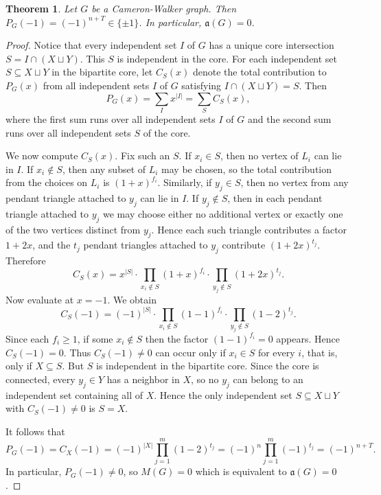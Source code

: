 \documentclass[12pt]{amsart}
\theoremstyle{plain}
\newtheorem{thm}{Theorem}[section]
\theoremstyle{definition}
\begin{document}
\begin{thm}\label{thm:CW_a}
  Let $G$ be a Cameron-Walker graph. Then \(P_G(-1)=(-1)^{n+T}\in\{\pm 1\}\).  In particular, $\mathfrak a (G)=0$.
\end{thm}



\begin{proof}
Notice that every independent set $I$ of $G$ has a unique core intersection  $S=I\cap (X\sqcup Y)$. This $S$ is independent in the core.  For each independent set $S\subseteq X\sqcup Y$ in the bipartite core, let $C_S(x)$ denote the total contribution to $P_G(x)$ from all independent sets $I$ of $G$ satisfying $I\cap (X\sqcup Y)=S$. Then
\[
P_G(x)=\sum_{I} x^{|I|}= \sum_{S} C_S(x),
\]
where the first sum runs over all independent sets $I$ of $G$ and the second sum runs over all independent sets $S$ of the core.

We now compute $C_S(x)$. Fix such an $S$.  If $x_i\in S$, then no vertex of $L_i$ can lie in $I$. If $x_i\notin S$, then any subset of $L_i$ may be chosen, so the total contribution from the choices on $L_i$ is \((1+x)^{f_i}\). Similarly, if $y_j\in S$, then no vertex from any pendant triangle attached to $y_j$ can lie in $I$. If $y_j\notin S$, then in each pendant triangle attached to $y_j$ we may choose either no additional vertex or exactly one of the two vertices distinct from $y_j$. Hence each such triangle contributes a factor $1+2x$, and the $t_j$ pendant triangles attached to $y_j$ contribute \((1+2x)^{t_j}\). Therefore
\[
C_S(x)=x^{|S|}\cdot \prod_{x_i\notin S}(1+x)^{f_i}\cdot \prod_{y_j\notin S}(1+2x)^{t_j}.
\]
Now evaluate at $x=-1$. We obtain
\[
C_S(-1)=(-1)^{|S|}\cdot \prod_{x_i\notin S}(1-1)^{f_i}\cdot \prod_{y_j\notin S}(1-2)^{t_j}.
\]
Since each $f_i\ge 1$, if some $x_i\notin S$ then the factor $(1-1)^{f_i}=0$ appears. Hence $C_S(-1)=0$. Thus $C_S(-1)\neq 0$ can occur only if $x_i\in S$ for every $i$, that is, only if $X\subseteq S$. But $S$ is independent in the bipartite core. Since the core is connected, every $y_j\in Y$ has a neighbor in $X$, so no $y_j$ can belong to an independent set containing all of $X$. Hence the only independent set $S\subseteq X\sqcup Y$ with $C_S(-1)\neq 0$ is $S=X$.


It follows that
\[
P_G(-1)=C_X(-1)=(-1)^{|X|}\prod_{j=1}^m(1-2)^{t_j}
= (-1)^n\prod_{j=1}^m(-1)^{t_j}
= (-1)^{n+T}.
\]
In particular, $P_G(-1)\neq 0$, so $M(G)=0$ which is equivalent to $\mathfrak a (G)=0$.
\end{proof}
\end{document}
